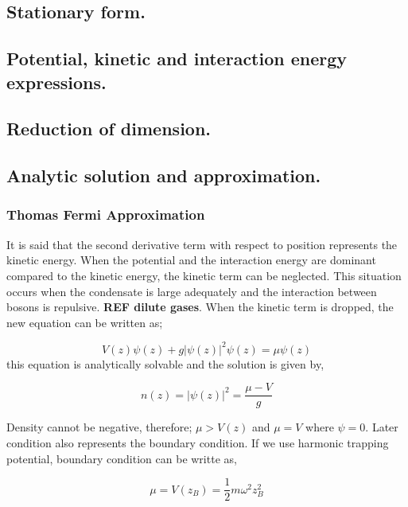 \documentclass[a4paper,times,hidelinks,12pt]{article}
\begin{document}
\subsection{Stationary form.}
\subsection{Potential, kinetic and interaction energy expressions.}
\subsection{Reduction of dimension.}
\subsection{Analytic solution and approximation.}

\subsubsection{Thomas Fermi Approximation}



It is said that the second derivative term with respect to position represents the kinetic energy. When the potential and the interaction energy are dominant compared to the kinetic energy, the kinetic term can be neglected. This situation occurs when the condensate is large adequately and the interaction between bosons is repulsive. \textbf{REF dilute gases}. When the kinetic term is dropped, the new equation can be written as;

\begin{equation}
\label{eq:GPE_1D_thomas_fermi}
    V(z)\psi(z) + g|\psi(z)|^2\psi(z) = \mu\psi(z)
\end{equation}
this equation is analytically solvable and the solution is given by,

\begin{equation}
\label{eq:thomas_fermi_solution}
    n(z) = |\psi(z)|^2 = \frac{\mu - V}{g}
\end{equation}

Density cannot be negative, therefore; $ \mu > V(z) $ and $ \mu = V$ where $\psi = 0$. Later condition also represents the boundary condition. If we use harmonic trapping potential, boundary condition can be writte as,

\begin{equation}
    \mu = V(z_B) = \frac{1}{2}m\omega^2z_B^2    
\end{equation}
\end{document}
